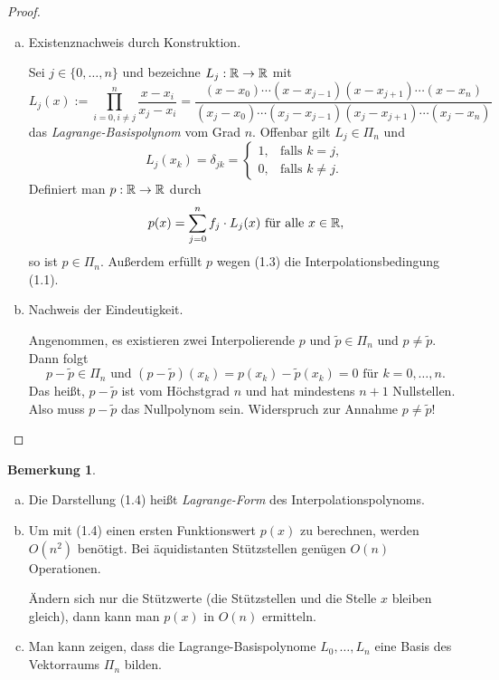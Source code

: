 \documentclass[
 a4paper,
 12pt,
 parskip=half
 ]{scrartcl}
\numberwithin{equation}{section}
\theoremstyle{plain}
\theoremstyle{definition}
\newtheorem{rmrk}{Bemerkung}[section] %
\numberwithin{equation}{section}
\begin{document}
\begin{proof}
 \begin{enumerate}[a)]
  \item Existenznachweis durch Konstruktion.
  
  Sei $j \in \{ 0, \ldots, n \}$ und bezeichne $L_j: \mathbb{R} \to \mathbb{R}$ mit
  \[ L_j(x) := \prod_{i=0,i \ne j}^n \frac{x-x_i}{x_j-x_i} = \frac{(x-x_0)\cdots(x-x_{j-1})(x-x_{j+1})\cdots(x-x_n)}{(x_j-x_0)\cdots(x_j-x_{j-1})(x_j-x_{j+1})\cdots(x_j-x_n)} \]
  das \emph{Lagrange-Basispolynom} vom Grad $n$. Offenbar gilt $L_j \in \Pi_n$ und
  \begin{equation} L_j(x_k) = \delta_{jk} = \begin{cases}
                 1, &\text{falls } k = j, \\
                 0, &\text{falls } k \ne j.
                \end{cases} \end{equation}
  Definiert man $p: \mathbb{R} \to \mathbb{R}$ durch
  \begin{equation} p(x) = \sum_{j=0}^n f_j \cdot L_j(x) \text{ für alle } x \in \mathbb{R}, \end{equation}
  so ist $p \in \Pi_n$. Außerdem erfüllt $p$ wegen (1.3) die Interpolationsbedingung (1.1).
  \item Nachweis der Eindeutigkeit.
  
  Angenommen, es existieren zwei Interpolierende $p$ und $\tilde{p} \in \Pi_n$ und $p \ne \tilde{p}$. Dann folgt 
  \[ p - \tilde{p} \in \Pi_n \text{ und } (p-\tilde{p})(x_k) = p(x_k) - \tilde{p}(x_k) = 0 \text{ für } k = 0, \ldots, n. \]
  Das heißt, $p - \tilde{p}$ ist vom Höchstgrad $n$ und hat mindestens $n+1$ Nullstellen. Also muss $p-\tilde{p}$ das Nullpolynom sein. Widerspruch zur Annahme $p \ne \tilde{p}$!
 \end{enumerate}
\end{proof}

\begin{rmrk}
 \begin{enumerate}[a)]
  \item Die Darstellung (1.4) heißt \emph{Lagrange-Form} des Interpolationspolynoms.
  \item Um mit (1.4) einen ersten Funktionswert $p(x)$ zu berechnen, werden $O(n^2)$ benötigt. Bei äquidistanten Stützstellen genügen $O(n)$ Operationen.
  
  Ändern sich nur die Stützwerte (die Stützstellen und die Stelle $x$ bleiben gleich), dann kann man $p(x)$ in $O(n)$ ermitteln.
  \item Man kann zeigen, dass die Lagrange-Basispolynome $L_0, \ldots, L_n$ eine Basis des Vektorraums $\Pi_n$ bilden.
 \end{enumerate}
\end{rmrk}
\end{document}
